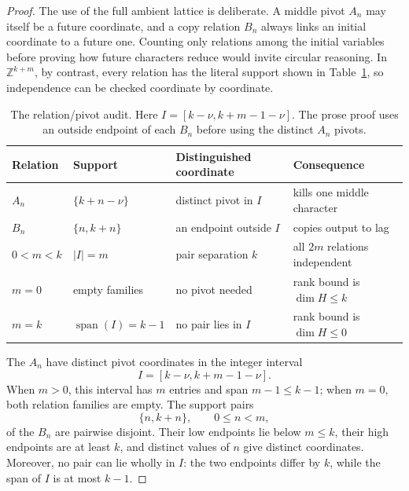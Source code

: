 \documentclass[11pt]{article}
\theoremstyle{definition}
\theoremstyle{remark}
\newcommand{\Z}{\mathbb{Z}}
\begin{document}
\begin{proof}
The use of the full ambient lattice is deliberate.  A middle pivot
$A_n$ may itself be a future coordinate, and a copy relation $B_n$ always
links an initial coordinate to a future one.  Counting only relations among
the initial variables before proving how future characters reduce would
invite circular reasoning.  In $\Z^{k+m}$, by contrast, every relation has
the literal support shown in Table~\ref{tab:pivots}, so independence can be
checked coordinate by coordinate.

\begin{table}[t]
\centering
\small
\renewcommand{\arraystretch}{1.15}
\begin{tabularx}{\textwidth}{@{}l l l X@{}}
\toprule
Relation & Support & Distinguished coordinate & Consequence \\
\midrule
$A_n$ & $\{k+n-\nu\}$ & distinct pivot in $I$ & kills one middle character \\
$B_n$ & $\{n,k+n\}$ & an endpoint outside $I$ & copies output to lag \\
$0<m<k$ & $|I|=m$ & pair separation $k$ & all $2m$ relations independent \\
$m=0$ & empty families & no pivot needed & rank bound is $\dim H\leq k$ \\
$m=k$ & $\operatorname{span}(I)=k-1$ & no pair lies in $I$ & rank bound is $\dim H\leq0$ \\
\bottomrule
\end{tabularx}
\caption{The relation/pivot audit.  Here $I=[k-\nu,k+m-1-\nu]$.  The prose proof uses an outside endpoint of each $B_n$ before using the distinct $A_n$ pivots.}
\label{tab:pivots}
\end{table}

The $A_n$ have distinct pivot coordinates in the integer interval
\begin{equation}
I=[k-\nu,k+m-1-\nu].
\label{eq:pivot-interval}
\end{equation}
When $m>0$, this interval has $m$ entries and span $m-1\leq k-1$;
when $m=0$, both relation families are empty.  The support pairs
\begin{equation}
\{n,k+n\},\qquad 0\leq n<m,
\label{eq:endpoint-pairs}
\end{equation}
of the $B_n$ are pairwise disjoint.  Their low endpoints lie below $m\leq k$, their high endpoints are at least $k$, and distinct values of $n$ give distinct coordinates.  Moreover, no pair can lie wholly in $I$: the two endpoints differ by $k$, while the span of $I$ is at most $k-1$.


\end{proof}
\end{document}
